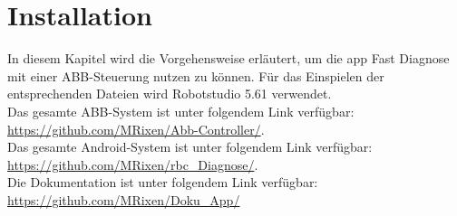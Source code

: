 \section{Installation}
\label{sec:Installation}
In diesem Kapitel wird die Vorgehensweise erläutert, um die \gls{app} Fast 
Diagnose mit einer ABB-Steuerung nutzen zu können. Für das Einspielen der 
entsprechenden Dateien wird Robotstudio 5.61 verwendet.\\
Das gesamte ABB-System ist unter folgendem Link verfügbar: \\
\url{https://github.com/MRixen/Abb-Controller/}.\\
Das gesamte Android-System ist unter folgendem Link verfügbar: \\
\url{https://github.com/MRixen/rbc_Diagnose/}.\\
Die Dokumentation ist unter folgendem Link verfügbar: \\
\url{https://github.com/MRixen/Doku_App/}

